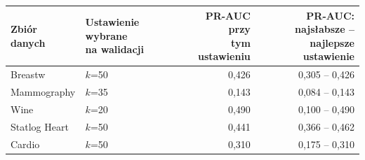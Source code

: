 \begin{tabular}{llrr}
\toprule
Zbiór danych & \makecell[l]{Ustawienie wybrane\\na walidacji} & \makecell[r]{PR-AUC przy\\tym ustawieniu} & \makecell[r]{PR-AUC: najsłabsze --\\najlepsze ustawienie} \\
\midrule
Breastw & $k$=50 & 0,426 & 0,305 -- 0,426 \\
Mammography & $k$=35 & 0,143 & 0,084 -- 0,143 \\
Wine & $k$=20 & 0,490 & 0,100 -- 0,490 \\
Statlog Heart & $k$=50 & 0,441 & 0,366 -- 0,462 \\
Cardio & $k$=50 & 0,310 & 0,175 -- 0,310 \\
\bottomrule
\end{tabular}
